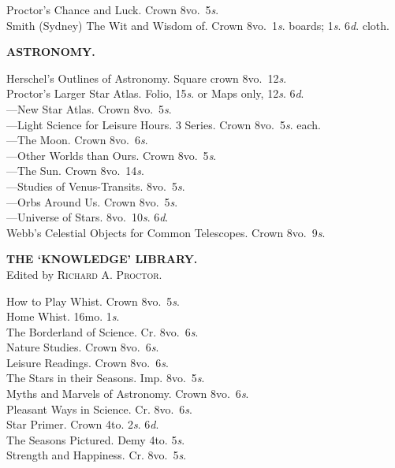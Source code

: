 \documentclass[letterpaper,12pt,oneside,openany]{memoir}
\newcommand{\E}{\hspace*{2mm}---\hspace*{2mm}}
\begin{document}
\begin{footnotesize}
Proctor's Chance and Luck. Crown 8vo.\ 5\textit{s}.\\
Smith (Sydney) The Wit and Wisdom of. Crown 8vo.\ 1\textit{s}. boards; 1\textit{s}. 6\textit{d}. cloth.
\begin{center}
\textbf{ASTRONOMY.}
\end{center}
Herschel's Outlines of Astronomy. Square crown 8vo.\ 12\textit{s}.\\
Proctor's Larger Star Atlas. Folio, 15\textit{s}. or Maps only, 12\textit{s}. 6\textit{d}.\\
\E New Star Atlas. Crown 8vo.\ 5\textit{s}.\\
\E Light Science for Leisure Hours. 3 Series. Crown 8vo.\ 5\textit{s}. each.\\
\E The Moon. Crown 8vo.\ 6\textit{s}.\\
\E Other Worlds than Ours. Crown 8vo.\ 5\textit{s}.\\
\E The Sun. Crown 8vo.\ 14\textit{s}.\\
\E Studies of Venus-Transits. 8vo.\ 5\textit{s}.\\
\E Orbs Around Us. Crown 8vo.\ 5\textit{s}.\\
\E Universe of Stars. 8vo.\ 10\textit{s}. 6\textit{d}.\\
Webb's Celestial Objects for Common Telescopes. Crown 8vo.\ 9\textit{s}.
\begin{center}
\textbf{THE `KNOWLEDGE' LIBRARY.}\\
{\tiny Edited by \textsc{Richard A. Proctor.}}\\
\end{center}
How to Play Whist. Crown 8vo.\ 5\textit{s}.\\
Home Whist. 16mo. 1\textit{s}.\\
The Borderland of Science. Cr. 8vo.\ 6\textit{s}.\\
Nature Studies. Crown 8vo.\ 6\textit{s}.\\
Leisure Readings. Crown 8vo.\ 6\textit{s}.\\
The Stars in their Seasons. Imp. 8vo.\ 5\textit{s}.\\
Myths and Marvels of Astronomy. Crown 8vo.\ 6\textit{s}.\\
Pleasant Ways in Science. Cr. 8vo.\ 6\textit{s}.\\
Star Primer. Crown 4to. 2\textit{s}. 6\textit{d}.\\
The Seasons Pictured. Demy 4to. 5\textit{s}.\\
Strength and Happiness. Cr. 8vo.\ 5\textit{s}.\\

\end{footnotesize}
\end{document}
